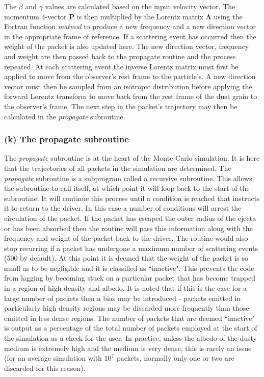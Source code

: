 		The $\beta$ and $\gamma$ values are calculated based on the input velocity vector.  The momentum 4-vector $\boldsymbol{P}$ is then multiplied by the Lorentz matrix $\boldsymbol{\Lambda}$ using the Fortran function \textit{matmul} to produce a  new frequency and a new direction vector in the appropriate frame of reference.  If a scattering event has occurred then the weight of the packet is also updated here.  The new direction vector, frequency and weight are then passed back to the propagate routine and the process repeated.   At each scattering event the inverse Lorentz matrix must first be applied to move from the observer's rest frame to the particle's.  A new direction vector must then be sampled from an isotropic distribution before applying the forward Lorentz transform to move back from the rest frame of the dust grain to the observer's frame.  The next step in the packet's trajectory may then be calculated in the \textit{propagate} subroutine.
		
		\subsubsection{(k) The propagate subroutine}
		The \textit{propagate} subroutine is at the heart of the Monte Carlo simulation.  It is here that the trajectories of all packets in the simulation are determined.  The \textit{propagate} subroutine is a subprogram called a recursive subroutine.  This allows the subroutine to call itself, at which point it will loop back to the start of the subroutine.  It will continue this process until a condition is reached that instructs it to return to the driver.  In this case a number of conditions will arrest the circulation of the packet. If the packet has escaped the outer radius of the ejecta or has been absorbed then the routine will pass this information along with the frequency and weight of the packet back to the driver.  The routine would also stop recurring if a packet has undergone a maximum number of scattering events (500 by default).  At this point it is deemed that the weight of the packet is so small as to be negligible and it is classified as ``inactive".  This prevents the code from lagging by becoming stuck on a particular packet that has become trapped in a region of high density and albedo. It is noted that if this is the case for a large number of packets then a bias may be introduced - packets emitted in particularly high density regions may be discarded more frequently than those emitted in less dense regions.  The number of packets that are deemed ``inactive" is output as a percentage of the total number of packets employed at the start of the simulation as a check for the user.  In practice, unless the albedo of the dusty medium is extremely high and the medium is very dense, this is rarely an issue (for an average simulation with $10^7$ packets, normally only one or two are discarded for this reason). 
				

